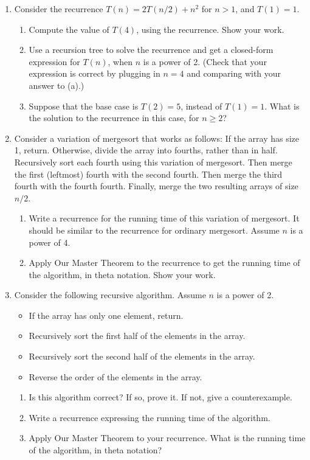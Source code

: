 \documentclass{article}
\begin{document}
\begin{enumerate}
    \item Consider the recurrence $T(n) = 2T(n/2) + n^2$ for $n > 1$, and $T(1) = 1$.
    \begin{enumerate}
        \item Compute the value of $T(4)$, using the recurrence. Show your work.
        \item Use a recursion tree to solve the recurrence and get a closed-form expression for $T(n)$, when $n$ is a power of 2. (Check that your expression is correct by plugging in $n = 4$ and comparing with your answer to (a).)
        \item Suppose that the base case is $T(2) = 5$, instead of $T(1) = 1$. What is the solution to the recurrence in this case, for $n \ge 2$?
    \end{enumerate}

    \item Consider a variation of mergesort that works as follows: If the array has size 1, return. Otherwise, divide the array into fourths, rather than in half. Recursively sort each fourth using this variation of mergesort. Then merge the first (leftmost) fourth with the second fourth. Then merge the third fourth with the fourth fourth. Finally, merge the two resulting arrays of size $n/2$.
    \begin{enumerate}
        \item Write a recurrence for the running time of this variation of mergesort. It should be similar to the recurrence for ordinary mergesort. Assume $n$ is a power of 4.
        \item Apply Our Master Theorem to the recurrence to get the running time of the algorithm, in theta notation. Show your work.
    \end{enumerate}

    \item Consider the following recursive algorithm. Assume $n$ is a power of 2.
    \begin{itemize}
        \item If the array has only one element, return.
        \item Recursively sort the first half of the elements in the array.
        \item Recursively sort the second half of the elements in the array.
        \item Reverse the order of the elements in the array.
    \end{itemize}
    \begin{enumerate}
        \item Is this algorithm correct? If so, prove it. If not, give a counterexample.
        \item Write a recurrence expressing the running time of the algorithm.
        \item Apply Our Master Theorem to your recurrence. What is the running time of the algorithm, in theta notation?
    \end{enumerate}


\end{enumerate}
\end{document}
